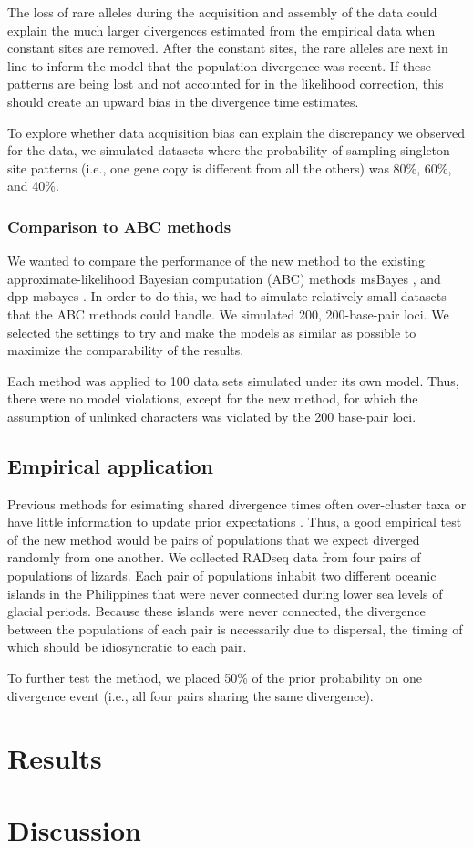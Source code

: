 The loss of rare alleles during the acquisition and assembly of the data could
explain the much larger divergences estimated from the empirical data when
constant sites are removed.
After the constant sites, the rare alleles are next in line to inform the model
that the population divergence was recent.
If these patterns are being lost and not accounted for in the likelihood
correction, this should create an upward bias in the divergence time estimates.

To explore whether data acquisition bias can explain the discrepancy we
observed for the  data, we simulated datasets where the
probability of sampling singleton site patterns (i.e., one gene copy is different from all the others)
was 80\%, 60\%, and 40\%.


\subsubsection{Comparison to ABC methods}
We wanted to compare the performance of the new method to the existing
approximate-likelihood Bayesian computation (ABC) methods msBayes
\citep{Huang2011}, and dpp-msbayes \citep{Oaks2014dpp}.
In order to do this, we had to simulate relatively small datasets
that the ABC methods could handle.
We simulated 200, 200-base-pair loci.
We selected the settings to try and make the models as similar
as possible to maximize the comparability of the results.

Each method was applied to 100 data sets simulated under its own model.
Thus, there were no model violations, except for the new method, for which the
assumption of unlinked characters was violated by the 200 base-pair loci.

\subsection{Empirical application}
Previous methods for esimating shared divergence times often over-cluster taxa
\citep{Oaks2012,Oaks2014reply} or have little information to update prior
expectations \citep{Oaks2014dpp}.
Thus, a good empirical test of the new method would be pairs of populations
that we expect diverged randomly from one another.
We collected RADseq data from four pairs of populations of  lizards.
Each pair of populations inhabit two different oceanic islands in the
Philippines that were never connected during lower sea levels of glacial
periods.
Because these islands were never connected, the divergence between the
populations of each pair is necessarily due to dispersal, the timing of which
should be idiosyncratic to each pair.

To further test the method, we placed 50\% of the prior probability on one
divergence event (i.e., all four pairs sharing the same divergence).


\section{Results}

\section{Discussion}
